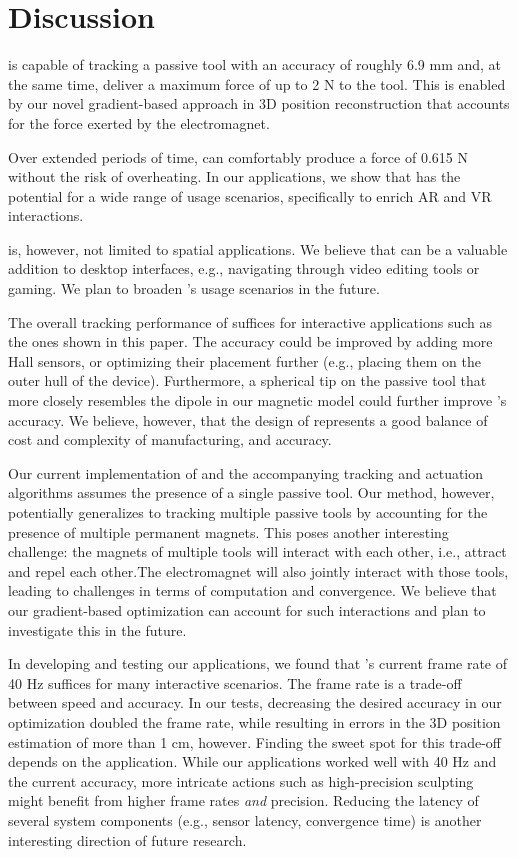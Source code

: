\section{Discussion}
\omniUIST is capable of tracking a passive tool with an accuracy of roughly 6.9 mm and, at the same time, deliver a maximum force of up to 2 N to the tool. This is enabled by our novel gradient-based approach in 3D position reconstruction that accounts for the force exerted by the electromagnet. 

Over extended periods of time, \omniUIST can comfortably produce a force of 0.615 N without the risk of overheating. In our applications, we show that \omniUIST has the potential for a wide range of usage scenarios, specifically to enrich AR and VR interactions.

\omniUIST is, however, not limited to spatial applications. We believe that \omniUIST can be a valuable addition to desktop interfaces, e.g., navigating through video editing tools or gaming. We plan to broaden \omniUIST's usage scenarios in the future.

The overall tracking performance of \omniUIST suffices for interactive applications such as the ones shown in this paper. The accuracy could be improved by adding more Hall sensors, or optimizing their placement further (e.g., placing them on the outer hull of the device).
Furthermore, a spherical tip on the passive tool that more closely resembles the dipole in our magnetic model could further improve \omniUIST's accuracy. We believe, however, that the design of \omniUIST represents a good balance of cost and complexity of manufacturing, and accuracy.

Our current implementation of \omniUIST and the accompanying tracking and actuation algorithms assumes the presence of a single passive tool. Our method, however, potentially generalizes to tracking multiple passive tools by accounting for the presence of multiple permanent magnets. This poses another interesting challenge: the magnets of multiple tools will interact with each other, i.e., attract and repel each other.The electromagnet will also jointly interact with those tools, leading to challenges in terms of computation and convergence. We believe that our gradient-based optimization can account for such interactions and plan to investigate this in the future.

In developing and testing our applications, we found that \omniUIST's current frame rate of 40 Hz suffices for many interactive scenarios. The frame rate is a trade-off between speed and accuracy. In our tests, decreasing the desired accuracy in our optimization doubled the frame rate, while resulting in errors in the 3D position estimation of more than 1 cm, however. Finding the sweet spot for this trade-off depends on the application. While our applications worked well with 40 Hz and the current accuracy, more intricate actions such as high-precision sculpting might benefit from higher frame rates \textit{and} precision.
Reducing the latency of several system components (e.g., sensor latency, convergence time) is another interesting direction of future research. 

